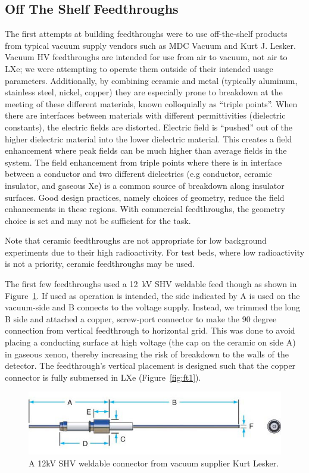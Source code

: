 \subsection{Off The Shelf Feedthroughs}
The first attempts at building feedthroughs were to use off-the-shelf products from typical vacuum supply vendors such as MDC Vacuum and Kurt J. Lesker. Vacuum \ac{HV} feedthroughs are intended for use from air to vacuum, not air to \ac{LXe}; we were attempting to operate them outside of their intended usage parameters. Additionally, by combining ceramic and metal (typically aluminum, stainless steel, nickel, copper) they are especially prone to breakdown at the meeting of these different materials, known colloquially as ``triple points''. When there are interfaces between materials with different permittivities (dielectric constants), the electric fields are distorted. Electric field is ``pushed'' out of the higher dielectric material into the lower dielectric material. This creates a field enhancement where peak fields can be much higher than average fields in the system. The field enhancement from triple points where there is in interface between a conductor and two different dielectrics (e.g conductor, ceramic insulator, and gaseous Xe) is a common source of breakdown along insulator surfaces. Good design practices, namely choices of geometry, reduce the field enhancements in these regions. With commercial feedthroughs, the geometry choice is set and may not be sufficient for the task.

Note that ceramic feedthroughs are not appropriate for low background experiments due to their high radioactivity. For test beds, where low radioactivity is not a priority, ceramic feedthroughs may be used.

The first few feedthroughs used a 12~kV \ac{SHV} weldable feed though as shown in Figure~\ref{fig:12kV-SHV}. If used as operation is intended, the side indicated by A is used on the vacuum-side and B connects to the voltage supply. Instead, we trimmed the long B side and attached a copper, screw-port connector to make the 90 degree connection from vertical feedthrough to horizontal grid. This was done to avoid placing a conducting surface at high voltage (the cap on the ceramic on side A) in gaseous xenon, thereby increasing the risk of breakdown to the walls of the detector. The feedthrough's vertical placement is designed such that the copper connector is fully submersed in \ac{LXe} (Figure~\ref{fig:ft1}).

 
\begin{figure}[htbp]
\begin{center}
\includegraphics[width=5in]{figures/testbed/12kV-SHV.jpg}
\caption{A 12kV SHV weldable connector from vacuum supplier Kurt Lesker.}
\label{fig:12kV-SHV}
\end{center}
\end{figure}

